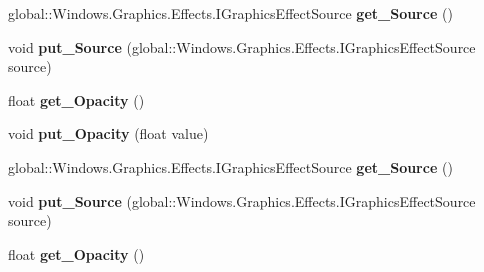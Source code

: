 \begin{DoxyCompactItemize}
global\+::\+Windows.\+Graphics.\+Effects.\+I\+Graphics\+Effect\+Source {\bfseries get\+\_\+\+Source} ()
\item 
\mbox{\label{interface_microsoft_1_1_graphics_1_1_canvas_1_1_effects_1_1_i_opacity_effect_a9ea7803e3e9d075e3baa03719edd7a57}} 
void {\bfseries put\+\_\+\+Source} (global\+::\+Windows.\+Graphics.\+Effects.\+I\+Graphics\+Effect\+Source source)
\item 
\mbox{\label{interface_microsoft_1_1_graphics_1_1_canvas_1_1_effects_1_1_i_opacity_effect_a5b292a8b09cbc683fee56e57c5fb9e50}} 
float {\bfseries get\+\_\+\+Opacity} ()
\item 
\mbox{\label{interface_microsoft_1_1_graphics_1_1_canvas_1_1_effects_1_1_i_opacity_effect_a869c5377258508b0dc30e395346a3315}} 
void {\bfseries put\+\_\+\+Opacity} (float value)
\item 
\mbox{\label{interface_microsoft_1_1_graphics_1_1_canvas_1_1_effects_1_1_i_opacity_effect_a77e279b93897a71f5fc330abc90056d4}} 
global\+::\+Windows.\+Graphics.\+Effects.\+I\+Graphics\+Effect\+Source {\bfseries get\+\_\+\+Source} ()
\item 
\mbox{\label{interface_microsoft_1_1_graphics_1_1_canvas_1_1_effects_1_1_i_opacity_effect_a9ea7803e3e9d075e3baa03719edd7a57}} 
void {\bfseries put\+\_\+\+Source} (global\+::\+Windows.\+Graphics.\+Effects.\+I\+Graphics\+Effect\+Source source)
\item 
\mbox{\label{interface_microsoft_1_1_graphics_1_1_canvas_1_1_effects_1_1_i_opacity_effect_a5b292a8b09cbc683fee56e57c5fb9e50}} 
float {\bfseries get\+\_\+\+Opacity} ()
\item 
\mbox{\label{interface_microsoft_1_1_graphics_1_1_canvas_1_1_effects_1_1_i_opacity_effect_a869c5377258508b0dc30e395346a3315}} 

\end{DoxyCompactItemize}
